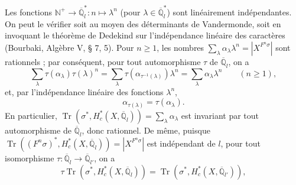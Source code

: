 \documentclass[9pt,twoside]{extarticle}
\begin{document}
{Les fonctions \(\mathbb N^+\to\overline{\mathbb Q}_l^*:n\mapsto\lambda^n\) (pour \(\lambda\in\overline{\mathbb Q}_l^*\)) sont linéairement indépendantes. On peut le vérifier soit au moyen des déterminants de Vandermonde, soit en invoquant le théorème de Dedekind sur l'indépendance linéaire des caractères (Bourbaki, Algèbre V, § 7, 5). Pour \(n\ge1\), les nombres \(\sum_\lambda\alpha_\lambda\lambda^n=|X^{F^n\sigma}|\) sont rationnels ; par conséquent, pour tout automorphisme \(\tau\) de \(\overline{\mathbb Q}_l\), on a \[
\sum_\lambda\tau(\alpha_\lambda)\tau(\lambda)^n
=
\sum_\lambda\tau(\alpha_{\tau^{-1}(\lambda)})\lambda^n
=
\sum_\lambda\alpha_\lambda\lambda^n
\qquad(n\ge1),
\] et, par l'indépendance linéaire des fonctions \(\lambda^n\), \[
\alpha_{\tau(\lambda)}=\tau(\alpha_\lambda).
\] En particulier, \(\operatorname{Tr}(\sigma^*,H_c^*(X,\overline{\mathbb Q}_l))=\sum_\lambda\alpha_\lambda\) est invariant par tout automorphisme de \(\overline{\mathbb Q}_l\), donc rationnel. De même, puisque \(\operatorname{Tr}((F^n\sigma)^*,H_c^*(X,\overline{\mathbb Q}_l))=|X^{F^n\sigma}|\) est indépendant de \(l\), pour tout isomorphisme \(\tau:\overline{\mathbb Q}_l\to\overline{\mathbb Q}_{l'}\), on a \[
\tau\operatorname{Tr}(\sigma^*,H_c^*(X,\overline{\mathbb Q}_l))
=
\operatorname{Tr}(\sigma^*,H_c^*(X,\overline{\mathbb Q}_{l'})),
\]\par
}
\end{document}
